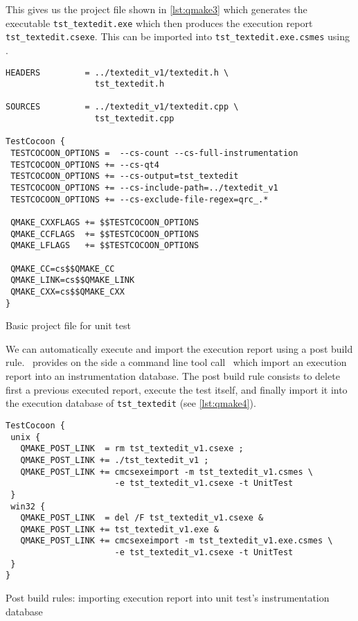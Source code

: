 This gives us the {\qmake} project file shown in \autoref{lst:qmake3} which generates
the executable \texttt{tst\_textedit.exe} which then produces the execution report
\texttt{tst\_textedit.csexe}. This can be imported into \texttt{tst\_textedit.exe.csmes}
using \CoverageBrowser.

\begin{listings}[H]
  \scriptsize
\begin{verbatim}
HEADERS         = ../textedit_v1/textedit.h \
                  tst_textedit.h

SOURCES         = ../textedit_v1/textedit.cpp \
                  tst_textedit.cpp

TestCocoon {
 TESTCOCOON_OPTIONS =  --cs-count --cs-full-instrumentation
 TESTCOCOON_OPTIONS += --cs-qt4
 TESTCOCOON_OPTIONS += --cs-output=tst_textedit
 TESTCOCOON_OPTIONS += --cs-include-path=../textedit_v1
 TESTCOCOON_OPTIONS += --cs-exclude-file-regex=qrc_.*

 QMAKE_CXXFLAGS += $$TESTCOCOON_OPTIONS
 QMAKE_CCFLAGS  += $$TESTCOCOON_OPTIONS
 QMAKE_LFLAGS   += $$TESTCOCOON_OPTIONS

 QMAKE_CC=cs$$QMAKE_CC
 QMAKE_LINK=cs$$QMAKE_LINK
 QMAKE_CXX=cs$$QMAKE_CXX
}

\end{verbatim}
\caption{Basic {\qmake} project file for unit test}
\label{lst:qmake3}
\end{listings}

We can automatically execute and import the execution report using a post build
rule. \TestCocoon\ provides on the side a command line tool call \cmcsexeimport\
which import an execution report into an instrumentation database.
The post build rule consists to delete first a previous executed report,
execute the test itself, and finally import it into the execution database of
\verb$tst_textedit$ (see \autoref{lst:qmake4}).


\begin{listings}[H]
  \scriptsize
\begin{verbatim}
TestCocoon {
 unix {
   QMAKE_POST_LINK  = rm tst_textedit_v1.csexe ;
   QMAKE_POST_LINK += ./tst_textedit_v1 ;
   QMAKE_POST_LINK += cmcsexeimport -m tst_textedit_v1.csmes \
                      -e tst_textedit_v1.csexe -t UnitTest
 }
 win32 {
   QMAKE_POST_LINK  = del /F tst_textedit_v1.csexe &
   QMAKE_POST_LINK += tst_textedit_v1.exe &
   QMAKE_POST_LINK += cmcsexeimport -m tst_textedit_v1.exe.csmes \
                      -e tst_textedit_v1.csexe -t UnitTest
 }
}
\end{verbatim}
\caption{Post build rules: importing execution report into unit test's instrumentation database}
\label{lst:qmake4}
\end{listings}

